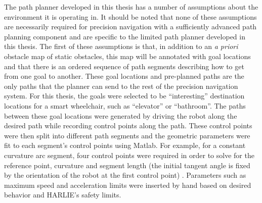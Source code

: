 The path planner developed in this thesis has a number of assumptions about the environment it is operating in. It should be noted that none of these assumptions are necessarily required for precision navigation with a sufficiently advanced path planning component and are specific to the limited path planner developed in this thesis. The first of these assumptions is that, in addition to an \emph{a priori} obstacle map of static obstacles, this map will be annotated with goal locations and that there is an ordered sequence of path segments describing how to get from one goal to another. These goal locations and pre-planned paths are the only paths that the planner can send to the rest of the precision navigation system. For this thesis, the goals were selected to be ``interesting'' destination locations for a smart wheelchair, such as ``elevator'' or ``bathroom''. The paths between these goal locations were generated by driving the robot along the desired path while recording control points along the path. These control points were then split into different path segments and the geometric parameters were fit to each segment's control points using Matlab. For example, for a constant curvature arc segment, four control points were required in order to solve for the reference point, curvature and segment length (the initial tangent angle is fixed by the orientation of the robot at the first control point) . Parameters such as maximum speed and acceleration limits were inserted by hand based on desired behavior and HARLIE's safety limits.

